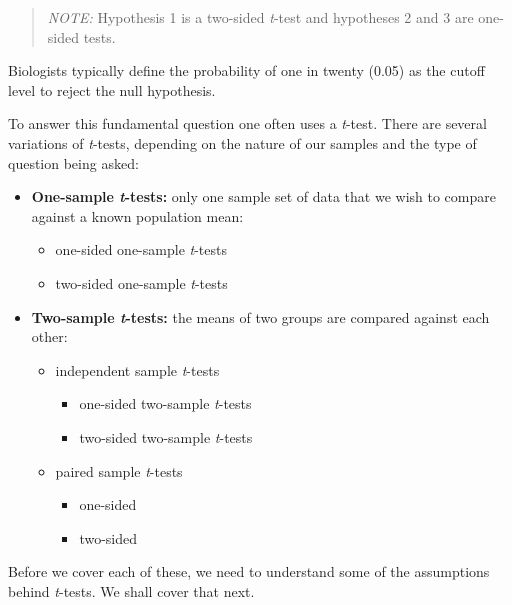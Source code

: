 \documentclass[english,10pt,a4paper,oneside]{book}
\providecommand{\tightlist}{%
  \setlength{\itemsep}{0pt}\setlength{\parskip}{0pt}}
\theoremstyle{definition}
\theoremstyle{definition}
\theoremstyle{definition}
\theoremstyle{remark}
\begin{document}
\begin{quote}
\emph{NOTE:} Hypothesis 1 is a two-sided \emph{t}-test and hypotheses 2
and 3 are one-sided tests.
\end{quote}

Biologists typically define the probability of one in twenty (0.05) as
the cutoff level to reject the null hypothesis.

To answer this fundamental question one often uses a \emph{t}-test.
There are several variations of \emph{t}-tests, depending on the nature
of our samples and the type of question being asked:

\begin{itemize}
\tightlist
\item
  \textbf{One-sample \emph{t}-tests:} only one sample set of data that
  we wish to compare against a known population mean:

  \begin{itemize}
  \tightlist
  \item
    one-sided one-sample \emph{t}-tests
  \item
    two-sided one-sample \emph{t}-tests
  \end{itemize}
\item
  \textbf{Two-sample \emph{t}-tests:} the means of two groups are
  compared against each other:

  \begin{itemize}
  \tightlist
  \item
    independent sample \emph{t}-tests

    \begin{itemize}
    \tightlist
    \item
      one-sided two-sample \emph{t}-tests
    \item
      two-sided two-sample \emph{t}-tests
    \end{itemize}
  \item
    paired sample \emph{t}-tests

    \begin{itemize}
    \tightlist
    \item
      one-sided
    \item
      two-sided
    \end{itemize}
  \end{itemize}
\end{itemize}

Before we cover each of these, we need to understand some of the
assumptions behind \emph{t}-tests. We shall cover that next.
\end{document}
